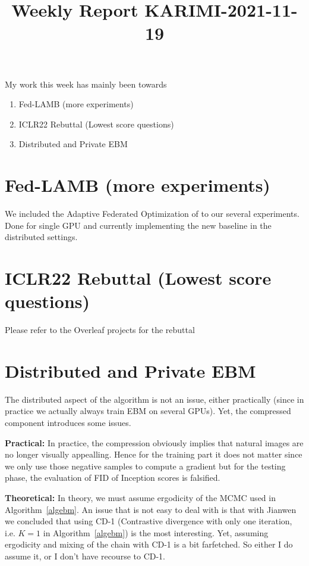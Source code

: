 \documentclass{article}
\begin{document}
\title{Weekly Report KARIMI-2021-11-19}


\date{}
\maketitle




My work this week has mainly been towards
\begin{enumerate}
\item Fed-LAMB (more experiments)
\item ICLR22 Rebuttal (Lowest score questions)
\item Distributed and Private EBM
\end{enumerate}

\section{Fed-LAMB (more experiments)}
We included the Adaptive Federated Optimization of \citep{reddi2020adaptive} to our several experiments.
Done for single GPU and currently implementing the new baseline in the distributed settings.

\section{ICLR22 Rebuttal (Lowest score questions)}
Please refer to the Overleaf projects for the rebuttal

\section{Distributed and Private EBM}
The distributed aspect of the algorithm is not an issue, either practically (since in practice we actually always train EBM on several GPUs).
Yet, the compressed component introduces some issues.

\textbf{Practical:} In practice, the compression obviously implies that natural images are no longer visually appealling. Hence for the training part it does not matter since we only use those negative samples to compute a gradient but for the testing phase, the evaluation of FID of Inception scores is falsified.

\textbf{Theoretical:} In theory, we must assume ergodicity of the MCMC used in Algorithm~\ref{algebm}. An issue that is not easy to deal with is that with Jianwen we concluded that using CD-1 (Contrastive divergence with only one iteration, i.e. $K=1$ in Algorithm~\ref{algebm}) is the most interesting. Yet, assuming ergodicity and mixing of the chain with CD-1 is a bit farfetched.
So either I do assume it, or I don't have recourse to CD-1.
\end{document}
